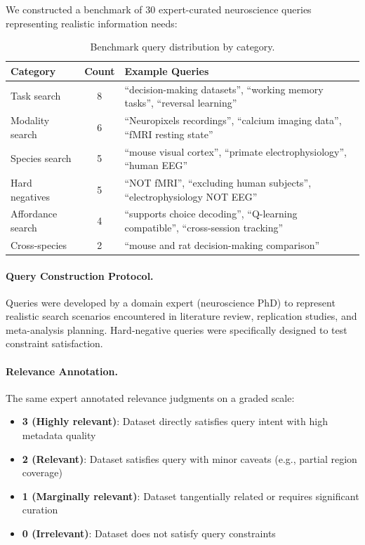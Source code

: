 \documentclass{article}
\theoremstyle{definition}
\begin{document}
We constructed a benchmark of 30 expert-curated neuroscience queries representing realistic information needs:

\begin{table}[t]
\centering
\small
\caption{Benchmark query distribution by category.}
\label{tab:query-categories}
\begin{tabular}{lcp{5.5cm}}
\toprule
\textbf{Category} & \textbf{Count} & \textbf{Example Queries} \\
\midrule
Task search & 8 & ``decision-making datasets'', ``working memory tasks'', ``reversal learning'' \\
Modality search & 6 & ``Neuropixels recordings'', ``calcium imaging data'', ``fMRI resting state'' \\
Species search & 5 & ``mouse visual cortex'', ``primate electrophysiology'', ``human EEG'' \\
Hard negatives & 5 & ``NOT fMRI'', ``excluding human subjects'', ``electrophysiology NOT EEG'' \\
Affordance search & 4 & ``supports choice decoding'', ``Q-learning compatible'', ``cross-session tracking'' \\
Cross-species & 2 & ``mouse and rat decision-making comparison'' \\
\bottomrule
\end{tabular}
\end{table}

\paragraph{Query Construction Protocol.} Queries were developed by a domain expert (neuroscience PhD) to represent realistic search scenarios encountered in literature review, replication studies, and meta-analysis planning. Hard-negative queries were specifically designed to test constraint satisfaction.

\paragraph{Relevance Annotation.} The same expert annotated relevance judgments on a graded scale:
\begin{itemize}
    \item \textbf{3 (Highly relevant)}: Dataset directly satisfies query intent with high metadata quality
    \item \textbf{2 (Relevant)}: Dataset satisfies query with minor caveats (e.g., partial region coverage)
    \item \textbf{1 (Marginally relevant)}: Dataset tangentially related or requires significant curation
    \item \textbf{0 (Irrelevant)}: Dataset does not satisfy query constraints
\end{itemize}
\end{document}
